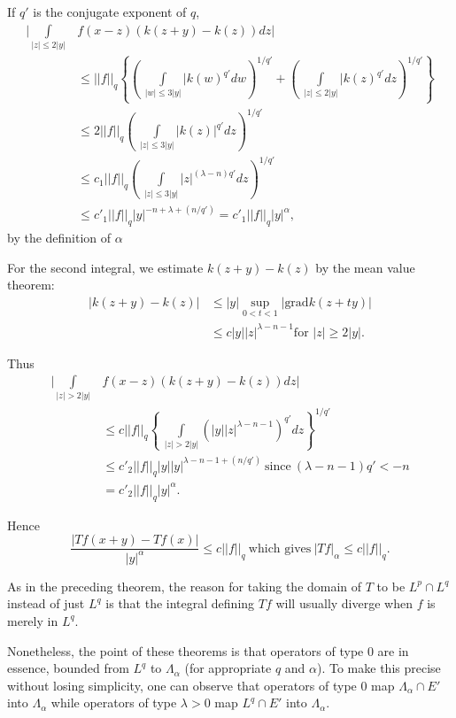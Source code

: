 If $q'$ is the conjugate exponent of $q$,
\begin{align*}
  |\int\limits_{|z| \leq 2 |y|} & f (x-z)(k (z+y) - k (z) ) dz|\\
  & \leq || f || _q \left\{ \left(~ \int\limits_{|w| \leq 3 |y|} | k(w)^{q'} dw
  \right)^{1/q'} +  \left(~\int\limits_{|z| \leq 2 |y|} | k (z)^{q'}
  dz\right)^{1/q'} \right\} \\ 
  & \leq 2 || f || _q \left(~\int\limits_{|z| \leq 3 |y|} | k (z)
  |^{q'} dz \right)^{1/q'} \\
  & \leq c_1 || f ||_q \left(~ \int\limits_{|z| \leq 3 |y|} |z|^{ (\lambda -
    n)q'} dz\right) ^{1/q'}\\ 
  &\leq c'_1 || f ||_q |y|^{-n + \lambda + (n/q')} = c'_1 || f || _q |y|^\alpha,
\end{align*}
by the definition of $\alpha$

For the second integral, we estimate $k(z+y) - k(z)$ by the mean value theorem:
\begin{align*}
  |k (z+y) - k (z)| & \leq |y| \sup_{0< t<1} | \text{grad} k (z+ty)|\\
  & \leq c |y||z| ^{\lambda - n -1} \text{for } |z| \geq 2 |y|.
\end{align*}

Thus
\begin{align*}
|\int\limits_{|z| > 2 |y|} & f (x-z) (k(z+y)- k(z)) dz|\\
  & \leq c || f || _q \left\{ ~\int\limits_{|z| > 2 |y|}\left(|y| |z|
  ^{\lambda-n-1}\right)^{q'}dz \right\}^{1/q'}\\ 
  & \leq c'_2 || f || _q |y| |y|^{\lambda - n-1+ (n/q')} ~\text{since}~
  (\lambda -n-1)q' < - n\\ 
  & = c'_2 || f || _q |y|^{\alpha}.
\end{align*}

Hence\pageoriginale 
$$
\frac{|Tf (x+y) - Tf (x)|}{|y|^{\alpha}} \leq c || f || _q ~\text{which
  gives}~ | Tf |_{\alpha} \leq c || f || _q. 
$$

\setcounter{rem}{25}
\begin{rem}\label{chap5:rem5.26}%
  As in the preceding theorem, the reason for taking the domain of $T$
  to be $L^p \cap L^q$ instead of just $L^q$ is that the integral
  defining $Tf$ will usually diverge when $f$ is merely in $L^q$. 
\end{rem} 


Nonetheless, the point of these theorems is that operators of type 0
are in essence, bounded from $L^q$ to $\Lambda_{\alpha}$ (for
appropriate $q$ and $\alpha$). To make this precise without losing
simplicity, one can observe that operators of type $ 0$ map
$\Lambda_{\alpha} \cap E'$ into $\Lambda_{\alpha}$ while operators of
type  $\lambda > 0$ map $L^q \cap E'$ into $\Lambda_{\alpha}$. 

